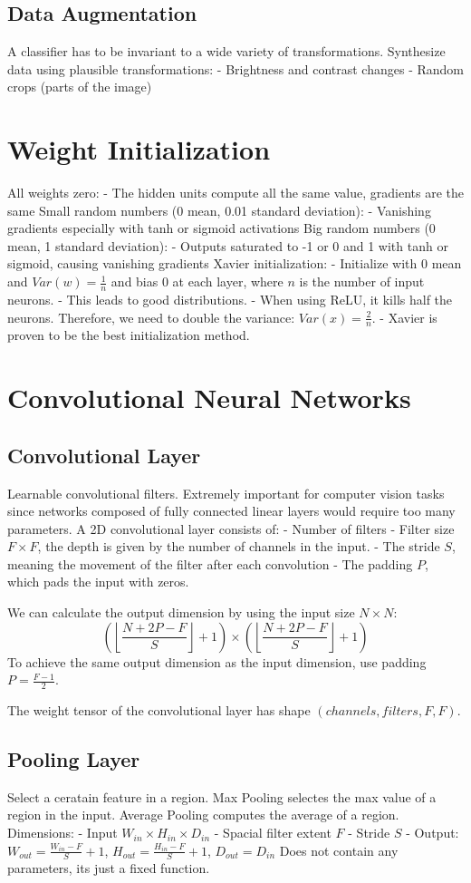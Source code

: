 \documentclass{scrartcl}
\begin{document}
\subsection*{Data Augmentation}
A classifier has to be invariant to a wide variety of transformations.
Synthesize data using plausible transformations:
- Brightness and contrast changes
- Random crops (parts of the image)


\section*{Weight Initialization}
All weights zero:
- The hidden units compute all the same value, gradients are the same
Small random numbers (0 mean, 0.01 standard deviation):
- Vanishing gradients especially with tanh or sigmoid activations
Big random numbers (0 mean, 1 standard deviation):
- Outputs saturated to -1 or 0 and 1 with tanh or sigmoid, causing vanishing gradients
Xavier initialization:
- Initialize with 0 mean and $Var(w) = \frac{1}{n}$ and bias 0 at each layer, where $n$ is the number of input neurons.
- This leads to good distributions.
- When using ReLU, it kills half the neurons. Therefore, we need to double the variance: $Var(x) = \frac{2}{n}$.
- Xavier is proven to be the best initialization method.


\section*{Convolutional Neural Networks}
\subsection*{Convolutional Layer}
Learnable convolutional filters. Extremely important for computer vision tasks since networks composed of fully connected linear layers would require too many parameters. 
A 2D convolutional layer consists of:
- Number of filters
- Filter size $F \times F$, the depth is given by the number of channels in the input.
- The stride $S$, meaning the movement of the filter after each convolution
- The padding $P$, which pads the input with zeros.

We can calculate the output dimension by using the input size $N \times N$:
$$\left (\left \lfloor{\frac{N + 2P - F}{S}}\right \rfloor + 1 \right) \times \left (\left \lfloor{\frac{N + 2P - F}{S}}\right \rfloor + 1 \right)$$
To achieve the same output dimension as the input dimension, use padding $P = \frac{F - 1}{2}$.

The weight tensor of the convolutional layer has shape $(channels, filters, F, F)$.

\subsection*{Pooling Layer}
Select a ceratain feature in a region. Max Pooling selectes the max value of a region in the input. Average Pooling computes the average of a region.
Dimensions:
- Input $W_{in} \times H_{in} \times D_{in}$
- Spacial filter extent $F$
- Stride $S$
- Output: $W_{out} = \frac{W_{in} - F}{S} + 1$, $H_{out} = \frac{H_{in} - F}{S} + 1$, $D_{out} = D_{in}$
Does not contain any parameters, its just a fixed function.
\end{document}
